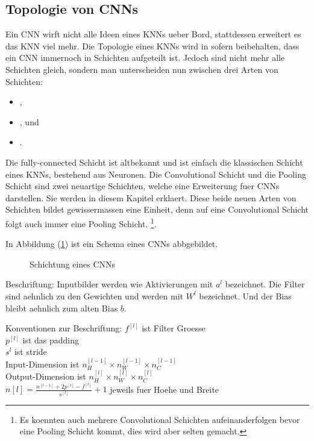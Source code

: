 \subsection{Topologie von CNNs}
Ein CNN wirft nicht alle Ideen eines KNNs ueber Bord, stattdessen erweitert es
das KNN viel mehr.
Die Topologie eines KNNs wird in sofern beibehalten, dass ein CNN immernoch in
Schichten aufgeteilt ist. Jedoch sind nicht mehr alle Schichten gleich, sondern
man unterscheiden nun zwischen drei Arten von Schichten:
\begin{itemize}
\item{,}
\item{, und}
\item{.}
\end{itemize}
Die fully-connected Schicht ist altbekannt und ist einfach die klassischen Schicht
eines KNNs, bestehend aus Neuronen.
Die Convolutional Schicht und die Pooling Schicht sind zwei neuartige Schichten,
welche eine Erweiterung fuer CNNs darstellen. Sie werden in diesem Kapitel erklaert.
Diese beide neuen Arten von Schichten bildet gewissermassen eine Einheit, denn
auf eine Convolutional Schicht folgt auch immer eine Pooling Schicht.
\footnote{
  Es koennten auch mehrere Convolutional Schichten aufeinanderfolgen bevor eine
  Pooling Schicht kommt, dies wird aber selten gemacht.
}.

\para{}
In Abbildung (\ref{fig:cnn_topology}) ist ein Schema eines CNNs abbgebildet.
\begin{figure}[h!]

  \caption{Schichtung eines CNNs}
  \label{fig:cnn_topology}
\end{figure}

Beschriftung:
Inputbilder werden wie Aktivierungen mit $a^l$ bezeichnet.
Die Filter sind aehnlich zu den Gewichten und werden mit $W^l$ bezeichnet.
Und der Bias bleibt aehnlich zum alten Bias $b$.

Konventionen zur Beschriftung:
$f^{[l]}$ ist Filter Groesse\\
$p^{[l]}$ ist das padding\\
$s^{l}$ ist stride\\
Input-Dimension ist $n_H^{[l-1]} \times n_W^{[l-1]} \times n_C^{[l-1]}$\\
Output-Dimension ist $n_H^{[l]} \times n_W^{[l]} \times n_C^{[l]}$\\

$n[l] = \frac{n^{[l-1]} + 2p^{[l]} - f^{[l]}}{s^{[l]}} + 1$ jeweils fuer Hoehe
und Breite\\


